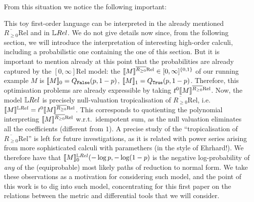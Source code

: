 From this situation we notice the following important:

\begin{remark}\label{rmk:tropof01Rel}
This toy first-order language can be interpreted in the already mentioned $\overline{R_{\geq 0}}\mathrm{Rel}$ and in $\LREL$.
We do not give details now since, from the following section, we will introduce the interpretation of interesting high-order calculi, including a probabilistic one containing the one of this section.
But it is important to mention already at this point that the probabilities are already captured by the $[0,\infty]\mathrm{Rel}$ model: the $\llbracket M\rrbracket^{\overline{R_{\geq 0}}\mathrm{Rel}}\in[0,\infty]^{\{0,1\}}$ of our running example $M$ is $\llbracket M\rrbracket_0=Q_{\mathtt{False}}(p,1-p)$, $\llbracket M\rrbracket_1=Q_{\mathtt{True}}(p,1-p)$.
Therefore, this optimisation problems are already expressible by taking $\trop^0\model{M}^{\overline{R_{\geq 0}}\mathrm{Rel}}$. 
Now, the model $\LREL$ is precisely null-valuation tropicalisation of $\overline{R_{\geq 0}}\mathrm{Rel}$, i.e.\ $\model{M}^{\LREL}=\trop^0\model{M}^{\overline{R_{\geq 0}}\mathrm{Rel}}$.
This corresponds to quotienting the polynomial interpreting $\llbracket M\rrbracket^{\overline{R_{\geq 0}}\mathrm{Rel}}$ w.r.t.\ idempotent sum, as the null valuation eliminates all the coefficients (different from $1$).
A precise study of the ``tropicalisation of $\overline{R_{\geq 0}}\mathrm{Rel}$'' is left for future investigations, as it is related with power series arising from more sophisticated calculi with paramethers (in the style of \cite{} {\color{red}Ehrhard!}).
We therefore have that $\model{M}^{\LREL}_0(-\log p,-\log (1-p)$ is the negative log-probability of \emph{any} of the (equiprobable) most likely paths of reduction to normal form.
We take these observations as a motivation for considering such model, and the point of this work is to dig into such model, concentrating for this first paper on the relations between the metric and differential tools that we will consider.
\end{remark}

